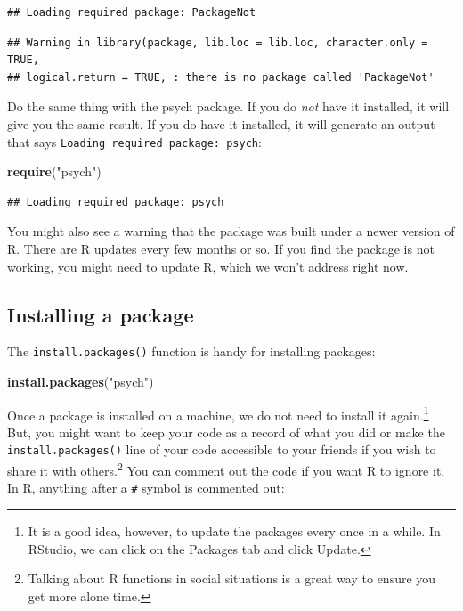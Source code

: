 \documentclass[
]{article}
\newenvironment{Shaded}{\begin{snugshade}}{\end{snugshade}}
\newcommand{\KeywordTok}[1]{\textcolor[rgb]{0.13,0.29,0.53}{\textbf{#1}}}
\newcommand{\NormalTok}[1]{#1}
\newcommand{\StringTok}[1]{\textcolor[rgb]{0.31,0.60,0.02}{#1}}
\begin{document}
\begin{verbatim}
## Loading required package: PackageNot
\end{verbatim}

\begin{verbatim}
## Warning in library(package, lib.loc = lib.loc, character.only = TRUE,
## logical.return = TRUE, : there is no package called 'PackageNot'
\end{verbatim}

Do the same thing with the psych package. If you do \emph{not} have it installed, it will give you the same result. If you do have it installed, it will generate an output that says \texttt{Loading\ required\ package:\ psych}:

\begin{Shaded}
\begin{Highlighting}[]
\KeywordTok{require}\NormalTok{(}\StringTok{"psych"}\NormalTok{)}
\end{Highlighting}
\end{Shaded}

\begin{verbatim}
## Loading required package: psych
\end{verbatim}

You might also see a warning that the package was built under a newer version of R. There are R updates every few months or so. If you find the package is not working, you might need to update R, which we won't address right now.

\hypertarget{installing-a-package}{%
\subsection{Installing a package}\label{installing-a-package}}

The \texttt{install.packages()} function is handy for installing packages:

\begin{Shaded}
\begin{Highlighting}[]
\KeywordTok{install.packages}\NormalTok{(}\StringTok{"psych"}\NormalTok{)}
\end{Highlighting}
\end{Shaded}

Once a package is installed on a machine, we do not need to install it again.\footnote{It is a good idea, however, to update the packages every once in a while. In RStudio, we can click on the Packages tab and click Update.} But, you might want to keep your code as a record of what you did or make the \texttt{install.packages()} line of your code accessible to your friends if you wish to share it with others.\footnote{Talking about R functions in social situations is a great way to ensure you get more alone time.} You can comment out the code if you want R to ignore it. In R, anything after a \texttt{\#} symbol is commented out:
\end{document}
